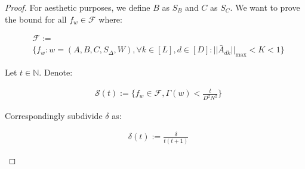 \begin{proof}
For aesthetic purposes, we define \( B \) as \( S_B \) and \( C \) as \( S_C \). We want to prove the bound for all $f_w \in \mathcal{F}$ where:
{
\begin{small}
\begin{equation*}
\begin{aligned}
&\mathcal{F} := \\&\{f_w : w = (A, B, C, S_\Delta, W), \forall k \in [L], d \in [D]:||\bar{A}^{}_{dk}||_{\max} < K < 1 \}
\end{aligned}
\end{equation*}
\end{small}}
Let $t \in \mathbb{N}$. Denote:
\begin{small}
\begin{equation*}
\begin{aligned}
&\mathcal{S}(t) := \{f_w \in \mathcal{F} , \Gamma(w) < {\frac{t}{D^2N^2}} \}
\end{aligned}
\end{equation*}
\end{small}
Correspondingly subdivide $\delta$ as:
\begin{small}
\begin{equation*}
\begin{aligned}
&\delta(t) := \frac{\delta}{t(t+1)}
\end{aligned}
\end{equation*}
\end{small}


\end{proof}
